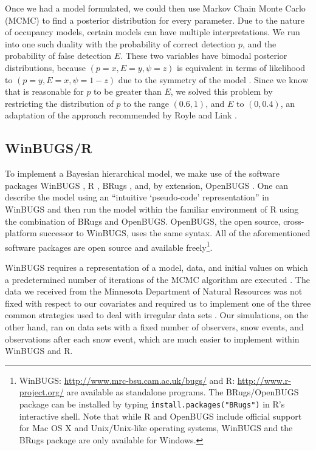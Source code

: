 \documentclass[12pt]{article}
\begin{document}
    Once we had a model formulated, we could then use Markov Chain Monte Carlo
    (MCMC) to find a posterior distribution for every parameter. Due to the
    nature of occupancy models, certain models can have multiple
    interpretations.
    We run into one such duality with the probability of correct detection
    \(p\), and the probability of false detection \(E\). These two variables
    have bimodal posterior distributions, because \((p=x,E=y,\psi=z)\) is
    equivalent in terms of likelihood to \((p=y,E=x,\psi=1-z)\) due to the
    symmetry of the model \cite{Royle2006}.  Since we know that is reasonable
    for \(p\) to be greater than \(E\), we solved this problem by restricting
    the distribution of \(p\) to the range \((0.6,1)\), and \(E\) to
    \((0,0.4)\), an adaptation of the approach recommended by Royle and
    Link \cite{Royle2006}.

    \subsection{WinBUGS/R}
    To implement a Bayesian hierarchical model, we make use of the software
    packages WinBUGS \cite{Lunn2000}, R \cite{R2009}, BRugs \cite{Thomas2008},
    and, by extension, OpenBUGS \cite{Thomas2006}. One can describe the model
    using an ``intuitive `pseudo-code' representation'' in WinBUGS
    \cite{MacKenzie2006} and then run the model within the familiar environment
    of R using the combination of BRugs and OpenBUGS. OpenBUGS, the open source,
    cross-platform successor to WinBUGS, uses the same syntax. All of the
    aforementioned software packages are open source and available
    freely\footnote{WinBUGS: \url{http://www.mrc-bsu.cam.ac.uk/bugs/} and R:
    \url{http://www.r-project.org/} are available as standalone programs. The
    BRugs/OpenBUGS package can be installed by typing
    \texttt{install.packages("BRugs")} in R's interactive shell. Note that while
    R and OpenBUGS include official support for Mac OS X and Unix/Unix-like
    operating systems, WinBUGS and the BRugs package are only available for
    Windows.}.

    WinBUGS requires a representation of a model, data, and initial values on
    which a predetermined number of iterations of the MCMC algorithm are
    executed \cite{MacKenzie2006}.
    The data we received from the
    Minnesota Department of Natural Resources was not fixed with respect to
    our covariates and required us to implement one of the three common
    strategies used to deal with irregular data sets \cite{Spiegelhalter2003}.
    Our simulations, on the other
    hand, ran on data sets with a fixed number of observers, snow events, and
    observations after each snow event, which are much easier to implement
    within WinBUGS and R.
\end{document}
